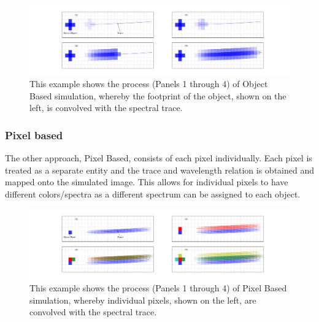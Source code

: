 \documentclass[preprint]{aastex}
\begin{document}
\begin{figure}[!t]
\centering
\includegraphics[width=7.5in]{"Figures/object_sim"}
\caption{This example shows the process (Panels 1 through 4) of Object Based simulation, whereby the footprint of the object, shown on the left, is convolved with the spectral trace.}
\label{sim:1}
\end{figure}

\subsubsection{Pixel based}

The other approach, Pixel Based, consists of each pixel individually. Each pixel is treated as a separate entity and the trace and wavelength relation is obtained and mapped onto the simulated image. This allows for individual pixels to have different colors/spectra as a different spectrum can be assigned to each object. 

\begin{figure}[!ht]
\centering
\includegraphics[width=7.5in]{"Figures/pixel_sim"}
\caption{This example shows the process (Panels 1 through 4) of Pixel Based simulation, whereby individual pixels, shown on the left, are convolved with the spectral trace.}
\label{sim:2}
\end{figure}

\end{document}
